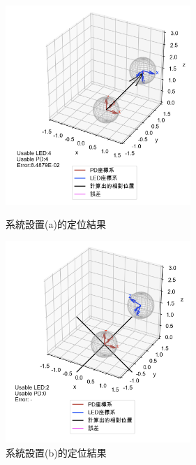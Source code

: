   \begin{figure}[htpb]
    \centering
    \begin{minipage}{.5\textwidth}
        \centering
        \includegraphics[width=7cm]{ch4pic/A.png}
        \caption{系統設置(a)的定位結果}
        \label{pic:A}
    \end{minipage}%
    \begin{minipage}{0.5\textwidth}
        \centering
        \includegraphics[width=7cm]{ch4pic/B.png}
        \caption{系統設置(b)的定位結果}
        \label{pic:B}
    \end{minipage}

\end{figure}

